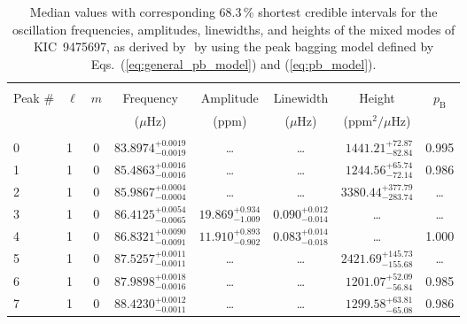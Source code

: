 
\begin{table*}[!]
\caption{Median values with corresponding 68.3\,\% shortest credible intervals for the oscillation frequencies, amplitudes, linewidths, and heights of the mixed modes of KIC~9475697, as derived by \diamonds\,\,by using the peak bagging model defined by Eqs.~(\ref{eq:general_pb_model}) and (\ref{eq:pb_model}).}
\label{tab:9475697m}
\centering
\begin{tabular}{llcrrlrc}
\hline\hline
\\[-8pt]      
Peak \# & $\ell$ & $m$ & \multicolumn{1}{c}{Frequency} & \multicolumn{1}{c}{Amplitude} & \multicolumn{1}{c}{Linewidth} & \multicolumn{1}{c}{Height}& $p_\mathrm{B}$\\
 & & & \multicolumn{1}{c}{($\mu$Hz)} & \multicolumn{1}{c}{(ppm)} & \multicolumn{1}{c}{($\mu$Hz)} & \multicolumn{1}{c}{(ppm$^2/\mu$Hz)}\\
\hline \\[-8pt]
0 & 1 & 0 & $     83.8974_{-      0.0019}^{+      0.0019}$ & \multicolumn{1}{c}{\dots} & \multicolumn{1}{c}{\dots} & $     1441.21_{-       82.84}^{+       72.87}$ & 0.995\\[1pt]
1 & 1 & 0 & $     85.4863_{-      0.0016}^{+      0.0016}$ & \multicolumn{1}{c}{\dots} & \multicolumn{1}{c}{\dots} & $     1244.56_{-       72.14}^{+       65.74}$ & 0.986\\[1pt]
2 & 1 & 0 & $     85.9867_{-      0.0004}^{+      0.0004}$ & \multicolumn{1}{c}{\dots} & \multicolumn{1}{c}{\dots} & $     3380.44_{-      283.74}^{+      377.79}$ & \dots \\[1pt]
3 & 1 & 0 & $     86.4125_{-      0.0065}^{+      0.0054}$ & $      19.869_{-       1.009}^{+       0.934}$ & $       0.090_{-       0.014}^{+       0.012}$ & \multicolumn{1}{c}{\dots} & \dots \\[1pt]
4 & 1 & 0 & $     86.8321_{-      0.0091}^{+      0.0090}$ & $      11.910_{-       0.902}^{+       0.893}$ & $       0.083_{-       0.018}^{+       0.014}$ & \multicolumn{1}{c}{\dots} & 1.000\\[1pt] 
5 & 1 & 0 & $     87.5257_{-      0.0011}^{+      0.0011}$ & \multicolumn{1}{c}{\dots} & \multicolumn{1}{c}{\dots} & $     2421.69_{-      155.68}^{+      145.73}$ & \dots \\[1pt]
6 & 1 & 0 & $     87.9898_{-      0.0016}^{+      0.0018}$ & \multicolumn{1}{c}{\dots} & \multicolumn{1}{c}{\dots} & $     1201.07_{-       56.84}^{+       52.09}$ & 0.985\\[1pt]
7 & 1 & 0 & $     88.4230_{-      0.0011}^{+      0.0012}$ & \multicolumn{1}{c}{\dots} & \multicolumn{1}{c}{\dots} & $     1299.58_{-       65.08}^{+       63.81}$ & 0.986\\[1pt]


\end{tabular}
\end{table*}
